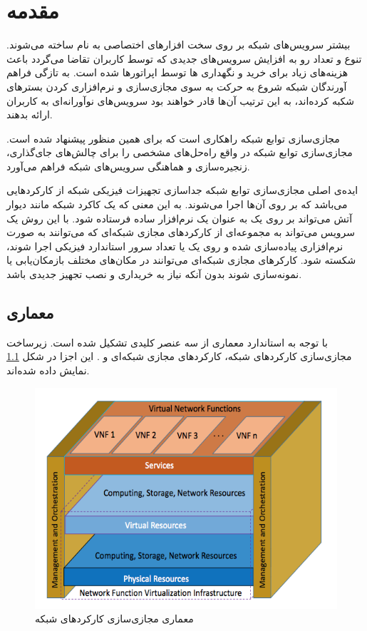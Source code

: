 \chapter{مقدمه}


بیشتر سرویس‌های شبکه بر روی سخت افزارهای اختصاصی به نام
ساخته می‌شوند.
تنوع و تعداد رو به افزایش سرویس‌های جدیدی که توسط کاربران تقاضا می‌گردد
باعث هزینه‌های زیاد برای خرید و نگهداری
‌ها
توسط اپراتورها شده است.
به تازگی فراهم آورندگان شبکه
شروع به حرکت به سوی مجازی‌سازی و نرم‌افزاری کردن بسترهای شکبه کرده‌اند،
به این ترتیب آن‌ها قادر خواهند بود
سرویس‌های نوآورانه‌ای به کاربران ارائه بدهند.

مجازی‌سازی توابع شبکه‌ راهکاری است که برای همین منظور پیشنهاد شده است.
مجازی‌سازی توابع شبکه‌ در واقع راه‌حل‌های مشخصی را برای چالش‌های جای‌گذاری،
زنجیره‌سازی و هماهنگی سرویس‌های شبکه فراهم می‌آورد.

ایده‌ی اصلی مجازی‌سازی توابع شبکه جداسازی تجهیزات فیزیکی شبکه از کارکردهایی می‌باشد که
بر روی آن‌ها اجرا می‌شوند.
به این معنی که یک کاکرد شبکه مانند دیوار آتش می‌تواند بر روی یک
به عنوان یک نرم‌افزار ساده فرستاده شود.
با این روش یک سرویس می‌تواند به مجموعه‌ای از کارکردهای مجازی شبکه‌ای که می‌توانند به صورت نرم‌افزاری پیاده‌سازی شده
و روی یک یا تعداد سرور استاندارد فیزیکی اجرا شوند، شکسته شود.
کارکرهای مجازی شبکه‌ای می‌توانند در مکان‌های مختلف بازمکان‌یابی یا نمونه‌سازی شوند بدون آنکه
نیاز به خریداری و نصب تجهیز جدیدی باشد.
\cite{Mijumbi2016}

\section{معماری }
با توجه به استاندارد  معماری 
از سه عنصر کلیدی تشکیل شده است.
زیرساخت مجازی‌سازی کارکردهای شبکه،
کارکردهای مجازی شبکه‌ای و
.
این اجزا در شکل \cref{fig.1} نمایش داده شده‌اند.

\begin{figure}[!h]
\center\includegraphics[scale=.6]{images/nfv-arch}
\caption{معماری مجازی‌سازی کارکردهای شبکه
\cite{Mijumbi2016}
}\label{fig.1}
\end{figure}

